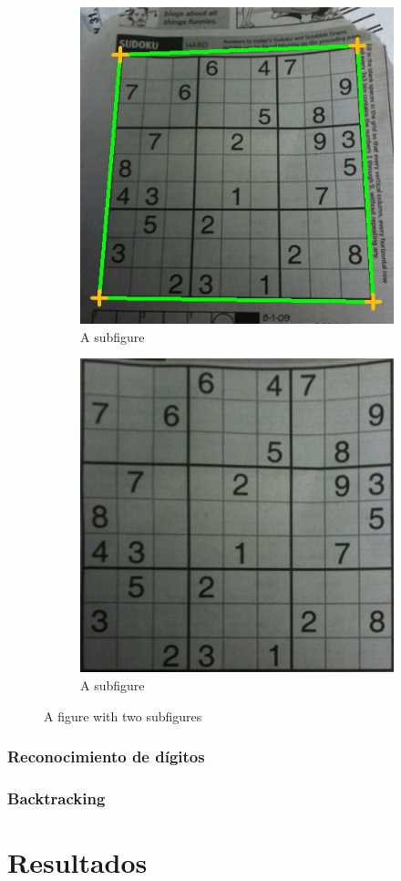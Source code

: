 \documentclass{article}
\begin{document}
\begin{figure}[H]
\centering
\begin{subfigure}{.5\textwidth}
  \centering
  \includegraphics[width=.6\linewidth]{esquinas}
  \caption{A subfigure}
  \label{fig:sub1}
\end{subfigure}%
\begin{subfigure}{.5\textwidth}
  \centering
  \includegraphics[width=.6\linewidth]{transformada}
  \caption{A subfigure}
  \label{fig:sub2}
\end{subfigure}
\caption{A figure with two subfigures}
\label{fig:test}
\end{figure}



\subsubsection{Reconocimiento de dígitos}
\subsubsection{Backtracking}
\section{Resultados}


    
\end{document}
